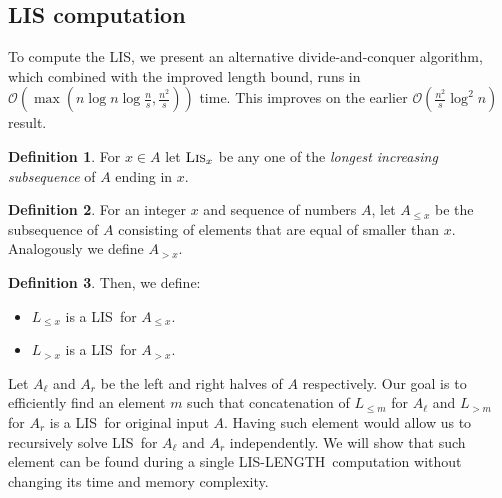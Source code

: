 \documentclass[lic, english, shortabstract]{iithesis}
\theoremstyle{plain}
\newcommand{\Lis}{\textsc{LIS}}
\newcommand{\LisLen}{\textsc{LIS-LENGTH}}
\theoremstyle{definition}
\newtheorem{definition}{Definition}[section]
\begin{document}

\subsection{LIS computation}
To compute the \Lis, we present an alternative divide-and-conquer algorithm, which combined with the improved length bound, runs in $\mathcal{O}(\max(n \log n \log \frac{n}{s}, \frac{n^2}{s}))$ time. This improves on the earlier $\mathcal{O}(\frac{n^2}{s} \log^2 n)$ result.

\begin{definition}
For $x \in A$ let $\textsc{Lis}_x$ be any one of the \textit{longest increasing subsequence} of $A$ ending in $x$.
\end{definition}

\begin{definition}
For an integer $x$ and sequence of numbers $A$, let $A_{\leq x}$ be the subsequence of $A$ consisting of elements that are equal of smaller than $x$. Analogously we define $A_{>x}$.
\end{definition}

\begin{definition}
Then, we define:
\begin{itemize}
\item $L_{\leq x}$ is a \Lis\ for $A_{\leq x}$.
\item $L_{>x}$ is a \Lis\ for $A_{>x}$.
\end{itemize}
\end{definition}

Let $A_{\ell}$ and $A_r$ be the left and right halves of $A$ respectively. Our goal is to efficiently find an element $m$ such that
concatenation of $L_{\leq m}$ for $A_\ell$ and $L_{> m}$ for $A_r$ is a \Lis\ for original input $A$. 
Having such element would allow us to recursively solve \Lis\ for $A_\ell$ and $A_r$ independently.
We will show that such element can be found during a single \LisLen\ computation without changing its time and memory complexity.
\end{document}
